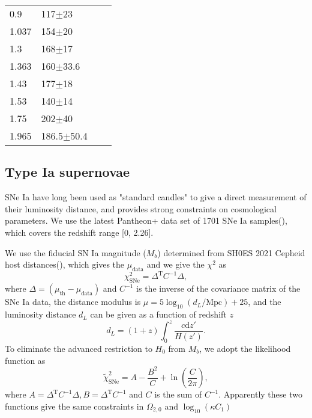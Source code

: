 \documentclass[twocolumn]{aastex631}
\begin{document}
\begin{table}[htbp]
\begin{tabular}{llll}
         0.9 & 117$\pm$23 & \cite{PhysRevD.71.123001} \\
         1.037 & 154$\pm$20 & \cite{M.Moresco_2012} \\
         1.3 & 168$\pm$17 & \cite{PhysRevD.71.123001} \\
         1.363 & 160$\pm$33.6 & \cite{10.1093/mnrasl/slv037} \\
         1.43 & 177$\pm$18 & \cite{PhysRevD.71.123001} \\
         1.53 & 140$\pm$14 & \cite{PhysRevD.71.123001} \\
         1.75 & 202$\pm$40 & \cite{PhysRevD.71.123001} \\
         1.965 & 186.5$\pm$50.4 & \cite{10.1093/mnrasl/slv037} \\
         \hline    
      \end{tabular}
      \label{tab:1}
   \end{table}

\subsection{Type Ia supernovae}

   SNe Ia have long been used as "standard candles" to give a direct
   measurement of their luminosity distance, and provides strong constraints
   on cosmological parameters. We use the latest Pantheon+ data set of 1701 
   SNe Ia samples(\cite{Scolnic_2022}), which covers the redshift range [0, 2.26].
   
   We use the fiducial SN Ia magnitude ($M_b$) determined from SH0ES 2021 Cepheid 
   host distances(\cite{Riess_2022}), which gives the $\mu_{\text{data}}$ and we 
   give the $\chi^2$ as 
   \begin{equation}
      \chi_{\text{SNe}}^2=\Delta^{\text{T}}C^{-1}\Delta,
   \end{equation}
   where $\Delta=(\mu_{\text{th}}-\mu_{\text{data}})$ and $C^{-1}$ is the inverse of the
   covariance matrix of the SNe Ia data, the distance modulus is $\mu=5\log_{10}(d_L/\text{Mpc})+25$, and the
   luminosity distance $d_L$ can be given as a function of redshift $z$
   \begin{equation}
      d_L=(1+z)\int_0^z\frac{c\mathrm{d}z'}{H(z')}.\label{eq:15}
   \end{equation}
   To eliminate the advanced restriction to $H_0$ from $M_b$, we adopt
   the likelihood function as
   \begin{equation}
      \widetilde{\chi}_{\text{SNe}}^2=A-\frac{B^2}{C}+\ln\left(\frac{C}{2\pi}\right),
   \end{equation}
   where $A=\Delta^{\text{T}}C^{-1}\Delta,B=\Delta^{\text{T}}C^{-1}$ and $C$ is the sum of $C^{-1}$.
   Apparently these two functions give the same constraints in $\Omega_{2,0}$ and
   $\log_{10}(\kappa C_1)$
\end{document}
